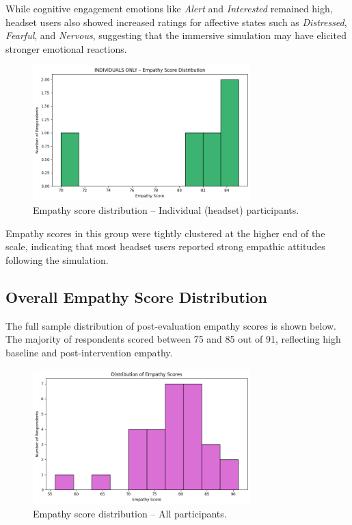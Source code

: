 While cognitive engagement emotions like \textit{Alert} and \textit{Interested} remained high, headset users also showed increased ratings for affective states such as \textit{Distressed}, \textit{Fearful}, and \textit{Nervous}, suggesting that the immersive simulation may have elicited stronger emotional reactions.

\begin{figure}[H]
    \centering
    \includegraphics[width=0.75\textwidth]{../../Figures/empathy-score-post-indiv.png}
    \caption{Empathy score distribution – Individual (headset) participants.}
    \label{fig:empathy_indiv_post}
\end{figure}

Empathy scores in this group were tightly clustered at the higher end of the scale, indicating that most headset users reported strong empathic attitudes following the simulation.

\subsection{Overall Empathy Score Distribution}

The full sample distribution of post-evaluation empathy scores is shown below. The majority of respondents scored between 75 and 85 out of 91, reflecting high baseline and post-intervention empathy.

\begin{figure}[H]
    \centering
    \includegraphics[width=0.75\textwidth]{../../Figures/empathy-score-post-all.png}
    \caption{Empathy score distribution – All participants.}
    \label{fig:empathy_all_post}
\end{figure}

